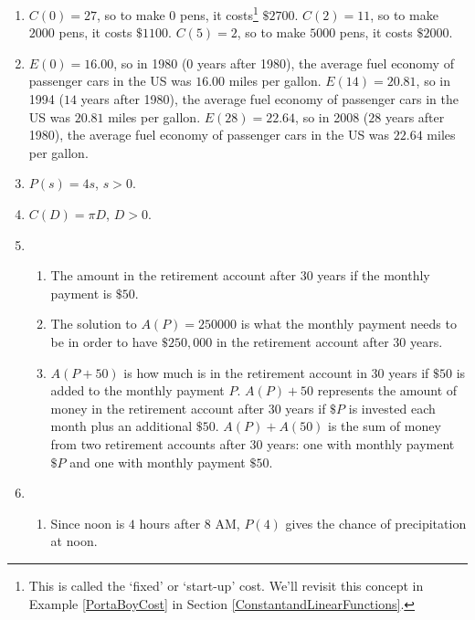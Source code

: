 \documentclass{ximera}
\begin{document}
\begin{enumerate}
\item $C(0) = 27$, so to make $0$ pens, it costs\footnote{This is called the `fixed' or `start-up' cost.  We'll revisit this concept in Example \ref{PortaBoyCost} in Section \ref{ConstantandLinearFunctions}.} $\$ 2700$.  $C(2) = 11$, so to make $2000$ pens, it costs $\$1100$.  $C(5) = 2$, so to make $5000$ pens, it costs $\$2000$.

\item $E(0) = 16.00$, so in 1980 ($0$ years after 1980), the average fuel economy of passenger cars in the US was $16.00$ miles per gallon.  $E(14) = 20.81$, so in 1994 ($14$ years after 1980), the average fuel economy of passenger cars in the US was $20.81$ miles per gallon.  $E(28) = 22.64$, so in 2008 ($28$ years after 1980), the average fuel economy of passenger cars in the US was $22.64$ miles per gallon.  


\item  $P(s) = 4s$, $s > 0$.

\item  $C(D) = \pi D$,  $D > 0$.

\item

\begin{enumerate}

\item The amount in the retirement account after 30 years if the monthly payment is $\$50$.

\item  The solution to $A(P) = 250000$ is what the monthly payment needs to be in order to have $\$250,\!000$ in the retirement account after 30 years.

\item  $A(P+50)$ is how much is in the retirement account in 30 years if $\$ 50$ is added to the monthly payment $P$.  $A(P)+50$ represents the amount of money in the retirement account after 30 years if $\$P$  is invested each month plus an additional $\$50$.  $A(P)+A(50)$ is the sum of money from two retirement accounts after 30 years: one with monthly payment $\$P$ and one with monthly payment $\$50$.

\end{enumerate}

\item  

\begin{enumerate}

\item  Since noon is $4$ hours after 8 AM, $P(4)$ gives the chance of precipitation at noon.


\end{enumerate}
\end{enumerate}
\end{document}
